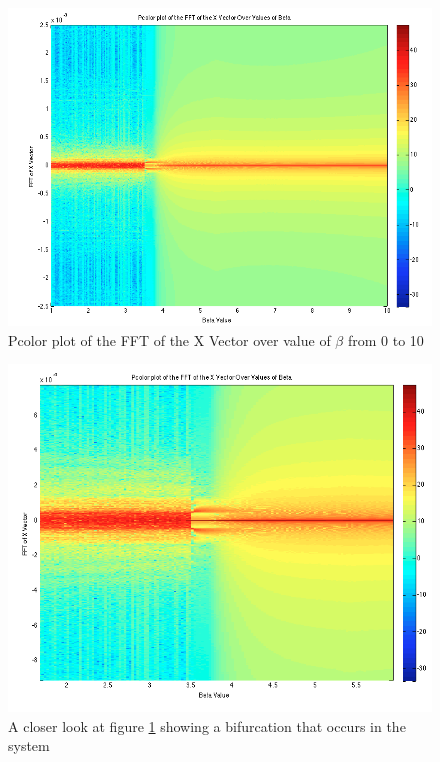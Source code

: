 \documentclass{article}[11pt]
\begin{document}
\begin{figure}[H]
\centering
\includegraphics[totalheight=0.4\textheight]{pcolor2.png}
\caption{Pcolor plot of the FFT of the X Vector over value of $\beta$ from 0 to 10}
\label{fig:pcolor2}
\end{figure}
\begin{figure}[H]
\centering
\includegraphics[totalheight=0.4\textheight]{pcolor3.png}
\caption{A closer look at figure \ref{fig:pcolor2} showing a bifurcation that occurs in the system}
\label{fig:pcolor3}
\end{figure}

\end{document}
